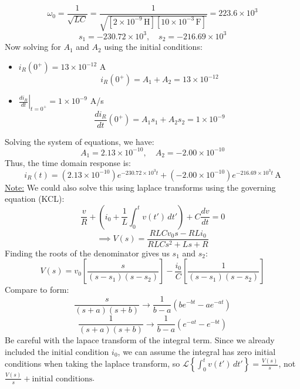 \documentclass[12pt]{article}
\begin{document}
\[\omega_0 = \frac{1}{\sqrt{LC}} = \frac{1}{\sqrt{[2\times10^{-9}\,\text{H}][10\times10^{-3}\,\text{F}]}} = 223.6\times10^{3}\]
\[s_1 = -230.72\times10^{3},\quad s_2 = -216.69\times10^{3}\]
\newpage\noindent
Now solving for $A_1$ and $A_2$ using the initial conditions:
\begin{itemize}
    \item $i_R(0^+) = 13\times10^{-12}$ A
    \[i_R(0^+) = A_1 + A_2 = 13\times10^{-12}\]
    \item $\left.\frac{di_R}{dt}\right|_{t=0^+} = 1\times10^{-9}$ A/s
    \[ \frac{di_R}{dt}(0^+) = A_1s_1 + A_2s_2 = 1\times10^{-9} \]
\end{itemize}
Solving the system of equations, we have:
\[A_1 = 2.13\times10^{-10},\quad A_2 = -2.00\times10^{-10}\]
Thus, the time domain response is:
\[\boxed{i_R(t) = (2.13\times10^{-10})e^{-230.72\times10^{3}t} + (-2.00\times10^{-10})e^{-216.69\times10^{3}t}\,\text{A}}\]
\underline{Note:} We could also solve this using laplace transforms using the governing equation (KCL):
\[\frac{v}{R}+\left(i_0+\frac{1}{L}\int_0^t v(t')\,dt'\right)+C\frac{dv}{dt} = 0\]
\[\implies V(s)= \frac{RLCv_0s-RLi_0}{RLCs^2+Ls+R}\]
Finding the roots of the denominator gives us $s_1$ and $s_2$:
\[V(s) = v_0\left[\frac{s}{(s-s_1)(s-s_2)}\right]-\frac{i_0}{C}\left[\frac{1}{(s-s_1)(s-s_2)}\right]\]
Compare to form:
\[\frac{s}{(s+a)(s+b)}\rightarrow \frac{1}{b-a}(be^{-bt}-ae^{-at})\]
\[\frac{1}{(s+a)(s+b)}\rightarrow \frac{1}{b-a}(e^{-at}-e^{-bt})\]
Be careful with the lapace transform of the integral term. Since we already included the initial condition $i_0$, we can assume the integral has zero initial conditions when taking the laplace transform, so $\mathcal{L}\left\{\int_0^t v(t')\,dt'\right\} = \frac{V(s)}{s}$, not $\frac{V(s)}{s} + \text{initial conditions}$.
\end{document}
